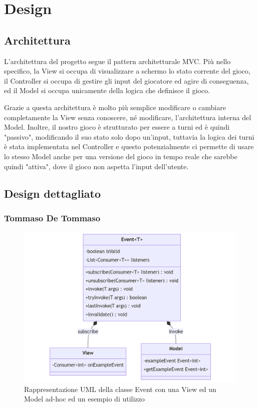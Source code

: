 \documentclass[a4paper,12pt]{report}
\begin{document}
\chapter{Design}

\section{Architettura}

L'architettura del progetto segue il pattern architetturale MVC.
%
Più nello specifico, la View si occupa di visualizzare a schermo lo stato corrente del gioco,
il Controller si occupa di gestire gli input del giocatore ed agire di conseguenza, ed
il Model si occupa unicamente della logica che definisce il gioco.

Grazie a questa architettura è molto più semplice modificare o cambiare completamente la View
senza conoscere, né modificare, l'architettura interna del Model.
%
Inoltre, il nostro gioco è strutturato per essere a turni ed è quindi "passivo", modificando il suo stato solo dopo un'input,
tuttavia la logica dei turni è stata implementata nel Controller e questo potenzialmente ci permette di usare lo stesso Model
anche per una versione del gioco in tempo reale che sarebbe quindi "attiva", dove il gioco non aspetta l'input dell'utente.

\section{Design dettagliato}

\subsection*{Tommaso De Tommaso}
\begin{figure}[H]
	\centering{}
	\includegraphics[width=\textwidth]{img/Event.png}
	\caption{Rappresentazione UML della classe Event con una View ed un Model ad-hoc ed un esempio di utilizzo}
	\label{img:Event}
\end{figure}
\end{document}
